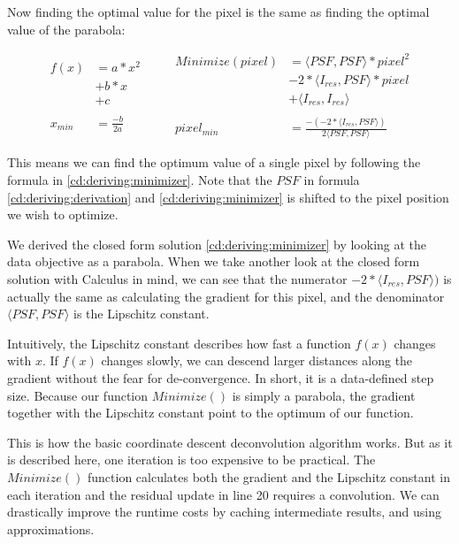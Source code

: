 Now finding the optimal value for the pixel is the same as finding the optimal value of the parabola:

\begin{equation} \label{cd:deriving:minimizer}
\begin{split}
f(x) & = a*x^2 \\
 & + b*x \\
 & + c\\
 \\
x_{min} & = \frac{-b}{2a}
\end{split}
\quad \quad
\begin{split}
Minimize(pixel) & = \langle PSF, PSF \rangle * pixel^2 \\
 & - 2*\langle I_{res},PSF\rangle * pixel \\
 &+ \langle I_{res}, I_{res} \rangle\\
 \\
pixel_{min} & = \frac{-(-2*\langle I_{res},PSF\rangle)}{2\langle PSF, PSF \rangle}
\end{split}
\end{equation}

This means we can find the optimum value of a single pixel by following the formula in \eqref{cd:deriving:minimizer}. Note that the $PSF$ in formula \eqref{cd:deriving:derivation} and \eqref{cd:deriving:minimizer} is shifted to the pixel position we wish to optimize.

We derived the closed form solution \eqref{cd:deriving:minimizer} by looking at the data objective as a parabola. When we take another look at the closed form solution with Calculus in mind, we can see that the numerator $-2*\langle I_{res},PSF\rangle)$ is actually the same as calculating the gradient for this pixel, and the denominator $\langle PSF, PSF \rangle$ is the Lipschitz constant. 

Intuitively, the Lipschitz constant describes how fast a function $f(x)$ changes with $x$. If $f(x)$ changes slowly, we can descend larger distances along the gradient without the fear for de-convergence. In short, it is a data-defined step size. Because our function $Minimize()$ is simply a parabola, the gradient together with the Lipschitz constant point to the optimum of our function.

This is how the basic coordinate descent deconvolution algorithm works. But as it is described here, one iteration is too expensive to be practical. The $Minimize()$ function calculates both the gradient and the Lipschitz constant in each iteration and the residual update in line 20 requires a convolution. We can drastically improve the runtime costs by caching intermediate results, and using approximations.


